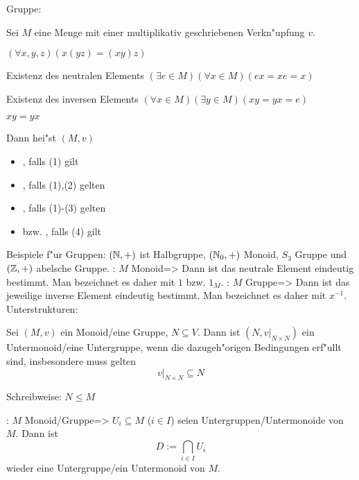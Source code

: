  Gruppe:{
  Sei $M$ eine Menge mit einer multiplikativ geschriebenen Verkn"upfung $v$.
  \begin{stmts}
    \item {} $(\forall x,y,z)(x(yz)=(xy)z)$
    \item Existenz des neutralen Elements
      $(\exists e\in M)(\forall x\in M)(ex=xe=x)$
    \item Existenz des inversen Elements
      $(\forall x\in M)(\exists y\in M)(xy=yx=e)$
    \item {} $xy=yx$
    \end{stmts}
  
  Dann hei"st $(M,v)$
  \begin{itemize}
    \item {}, falls (1) gilt
    \item {}, falls (1),(2) gelten
    \item {}, falls (1)-(3) gelten
    \item {} bzw. , falls (4) gilt
    \end{itemize}
  }
\example Beispiele f"ur Gruppen:{
  $(\mathbb N,+)$ ist Halbgruppe, $(\mathbb N_0,+)$ Monoid, $S_3$ Gruppe und 
  $(\mathbb Z,+)$ abelsche Gruppe.
  }
\theorem: $M$ Monoid=>{
  Dann ist das neutrale Element eindeutig bestimmt. Man bezeichnet es daher
  mit $1$ bzw. $1_M$.
  }
\theorem: $M$ Gruppe=>{
  Dann ist das jeweilige inverse Element eindeutig bestimmt. Man bezeichnet es
  daher mit $x^{-1}$.
  }
 Unterstrukturen:{
  Sei $(M,v)$ ein Monoid/eine Gruppe, $N\subseteq V$. Dann ist
  $(N,v|_{N\times N})$ ein Untermonoid/eine Untergruppe, wenn die 
  dazugeh"origen Bedingungen erf"ullt sind, insbesondere muss gelten
  \[v|_{N\times N} \subseteq N
    \]
  
  Schreibweise: $N\le M$
  }
\theorem: $M$ Monoid/Gruppe=>{
  \label{theo-schnittunter}
  $U_i\subseteq M$ ($i\in I$) seien Untergruppen/Untermonoide von $M$.
  Dann ist 
  \[D:=\bigcap_{i\in I}U_i
    \] 
  wieder eine Untergruppe/ein Untermonoid von $M$.
  }
